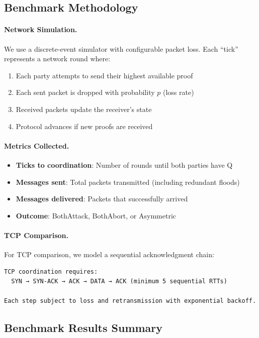 \subsection{Benchmark Methodology}

\paragraph{Network Simulation.}
We use a discrete-event simulator with configurable packet loss. Each ``tick'' represents a network round where:
\begin{enumerate}
    \item Each party attempts to send their highest available proof
    \item Each sent packet is dropped with probability $p$ (loss rate)
    \item Received packets update the receiver's state
    \item Protocol advances if new proofs are received
\end{enumerate}

\paragraph{Metrics Collected.}
\begin{itemize}
    \item \textbf{Ticks to coordination}: Number of rounds until both parties have Q
    \item \textbf{Messages sent}: Total packets transmitted (including redundant floods)
    \item \textbf{Messages delivered}: Packets that successfully arrived
    \item \textbf{Outcome}: BothAttack, BothAbort, or Asymmetric
\end{itemize}

\paragraph{TCP Comparison.}
For TCP comparison, we model a sequential acknowledgment chain:
\begin{verbatim}
TCP coordination requires:
  SYN → SYN-ACK → ACK → DATA → ACK (minimum 5 sequential RTTs)

Each step subject to loss and retransmission with exponential backoff.
\end{verbatim}

\subsection{Benchmark Results Summary}

